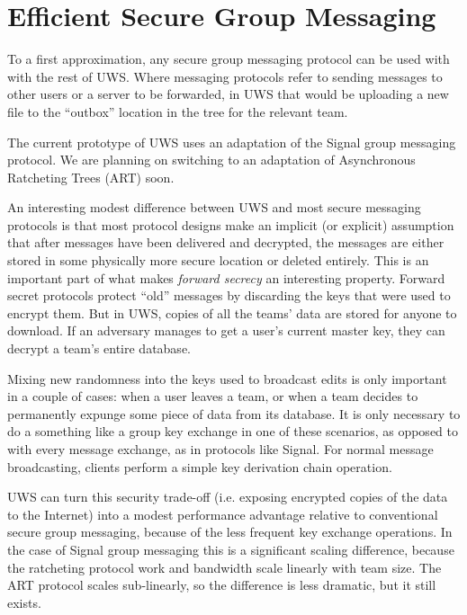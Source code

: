 \documentclass[runningheads]{llncs}
\begin{document}

\section{Efficient Secure Group Messaging}

To a first approximation, any secure group messaging protocol can be used with with the rest of UWS.
Where messaging protocols refer to sending messages to other users or a server to be forwarded, in UWS that would be uploading a new file to the ``outbox'' location in the tree for the relevant team.

The current prototype of UWS uses an adaptation of the Signal group messaging protocol.
We are planning on switching to an adaptation of Asynchronous Ratcheting Trees (ART)\cite{Cohn-Gordon2018} soon.

An interesting modest difference between UWS and most secure messaging protocols is that most protocol designs make an implicit (or explicit) assumption that after messages have been delivered and decrypted, the messages are either stored in some physically more secure location or deleted entirely.
This is an important part of what makes \emph{forward secrecy} an interesting property.
Forward secret protocols protect ``old'' messages by discarding the keys that were used to encrypt them.
But in UWS, copies of all the teams' data are stored for anyone to download.
If an adversary manages to get a user's current master key, they can decrypt a team's entire database.

Mixing new randomness into the keys used to broadcast edits is only important in a couple of cases: when a user leaves a team, or when a team decides to permanently expunge some piece of data from its database.
It is only necessary to do a something like a group key exchange in one of these scenarios, as opposed to with every message exchange, as in protocols like Signal.
For normal message broadcasting, clients perform a simple key derivation chain operation.

UWS can turn this security trade-off (i.e. exposing encrypted copies of the data to the Internet) into a modest performance advantage relative to conventional secure group messaging, because of the less frequent key exchange operations.
In the case of Signal group messaging this is a significant scaling difference, because the ratcheting protocol work and bandwidth scale linearly with team size.
The ART protocol scales sub-linearly, so the difference is less dramatic, but it still exists.
\end{document}
